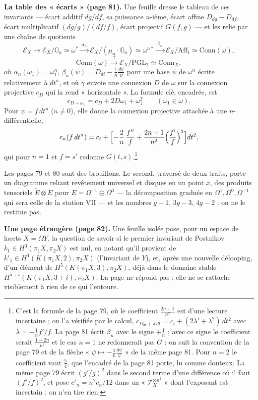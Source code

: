 \documentclass[11pt,a4paper]{article}
\begin{document}
\textbf{La table des « écarts » (page 81).} Une feuille dresse le tableau de
ces invariants — écart additif $dg/df$, sa puissance $n$-ième, écart affine
$D_{dg} - D_{df}$, écart multiplicatif $(dg/g)/(df/f)$, écart projectif
$G(f,g)$ — et les relie par une chaîne de quotients
\[
  \mathcal{E}_X \to \mathcal{E}_X/\mathbb{G}_a \simeq \omega^{*}
  \xrightarrow{\ \alpha_n\ } \mathcal{E}_X/(\mu_n\cdot\mathbb{G}_a) \simeq \omega^{n*}
  \xrightarrow{\ \beta_n\ } \mathcal{E}_X/\mathrm{Aff}_1 \simeq \mathrm{Conn}(\omega),
\]
\[
  \mathrm{Conn}(\omega) \xrightarrow{\ \gamma\ } \mathcal{E}_X/\mathrm{PGL}_2
  \simeq \mathrm{Conn}_X ,
\]
où $\alpha_n(\omega_1) = \omega_1^n$, $\beta_n(\psi) = D_{dt} - \frac1n \frac{d\psi}{\psi}$
pour une base $\psi$ de $\omega^n$ écrite relativement à $dt^n$, et où
$\gamma$ envoie une connexion $D$ de $\omega$ sur la connexion projective
$c_D$ qui la rend « horizontale ». La formule clé, encadrée, est
\[
  c_{D + \omega_1} = c_D + 2D\omega_1 + \omega_1^2 \qquad (\omega_1 \in \omega).
\]
Pour $\psi = f\,dt^n$ ($n \neq 0$), elle donne la connexion projective
attachée à une $n$-différentielle,
\[
  c_n(f\,dt^n) = c_t + \Bigl[-\frac{2}{n}\,\frac{f''}{f}
  + \frac{2n+1}{n^2}\Bigl(\frac{f'}{f}\Bigr)^2\Bigr]dt^2 ,
\]
qui pour $n = 1$ et $f = s'$ redonne $G(t,s)$.\footnote{C'est la formule de la
page 79, où le coefficient $\frac{2n+1}{n^2}$ est d'une lecture incertaine ; on
l'a vérifiée par le calcul, $c_{D_{dt} + \lambda\,dt} = c_t + (2\lambda' +
\lambda^2)\,dt^2$ avec $\lambda = -\frac1n f'/f$. La page 81 écrit $\beta_n$
avec le signe $+\frac1n$ ; avec ce signe le coefficient serait
$\frac{1-2n}{n^2}$ et le cas $n = 1$ ne redonnerait pas $G$ : on suit la
convention de la page 79 et de la flèche « $\psi \mapsto -\frac1n
\frac{d\psi}{\psi}$ » de la même page 81. Pour $n = 2$ le coefficient vaut
$\frac54$, que l'encadré de la page 81 porte, lu comme douteux. La même page
79 écrit $(g'/g)^2$ dans le second terme d'une différence où il faut
$(f'/f)^2$, et pose $c'_n = n^2 c_n/12$ dans un « $\mathcal{T}_X^{\otimes n^2}$ »
dont l'exposant est incertain ; on n'en tire rien.}

Les pages 79 et 80 sont des brouillons. Le second, traversé de deux traits,
porte un diagramme reliant revêtement universel et disques en un point
$x$, des produits tensoriels $\check{E} \otimes E$ pour $E = \Omega^{-1} \oplus
\Omega^0$ — la décomposition graduée en $\Omega^1, \Omega^0, \Omega^{-1}$ qui
sera celle de la station VII — et les nombres $g+1$, $3g-3$, $4g-2$ ; on ne
le restitue pas.

\textbf{Une page étrangère (page 82).} Une feuille isolée pose, pour un espace
de lacets $X = \Omega Y$, la question de savoir si le premier invariant de
Postnikov $k_1 \in H^3(\pi_1 X, \pi_2 X)$ est nul, en notant qu'il provient
de $k'_1 \in H^4(K(\pi_1 X, 2), \pi_2 X)$ (l'invariant de $Y$), et, après une
nouvelle délooping, d'un élément de $H^5(K(\pi_1 X, 3), \pi_2 X)$, déjà dans
le domaine stable $H^{5+i}(K(\pi_1X, 3+i), \pi_2X)$. La page ne répond pas ;
elle ne se rattache visiblement à rien de ce qui l'entoure.
\end{document}
